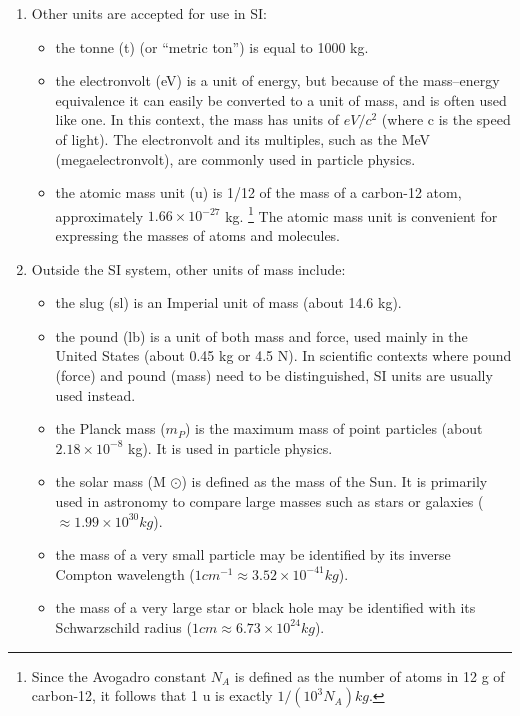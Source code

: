 \documentclass{book}
\begin{document}
    \begin{enumerate}
        \item Other units are accepted for use in SI:
        \begin{itemize}
            \item the tonne (t) (or ``metric ton'') is equal to 1000 kg.
            \item the electronvolt (eV) is a unit of energy, but because of the mass–energy equivalence it can easily be converted to a unit of mass, and is often used like one. In this context, the mass has units of $eV/c^2$ (where c is the speed of light). The electronvolt and its multiples, such as the MeV (megaelectronvolt), are commonly used in particle physics.
            \item the atomic mass unit (u) is 1/12 of the mass of a carbon-12 atom, approximately $1.66 \times 10^{-27}$ kg. \footnote{Since the Avogadro constant $N_A$ is defined as the number of atoms in 12 g of carbon-12, it follows that 1 u is exactly $1/(10^3 N_A) kg$.} The atomic mass unit is convenient for expressing the masses of atoms and molecules.
        \end{itemize}   
        
        \item Outside the SI system, other units of mass include:
        \begin{itemize}
            \item the slug (sl) is an Imperial unit of mass (about 14.6 kg).
            \item the pound (lb) is a unit of both mass and force, used mainly in the United States (about 0.45 kg or 4.5 N). In scientific contexts where pound (force) and pound (mass) need to be distinguished, SI units are usually used instead.
            \item the Planck mass ($m_P$) is the maximum mass of point particles (about $2.18 \times 10^{−8}$ kg). It is used in particle physics.
            \item the solar mass (M $\odot$) is defined as the mass of the Sun. It is primarily used in astronomy to compare large masses such as stars or galaxies ($\approx 1.99 \times 10^{30} kg$).
            \item the mass of a very small particle may be identified by its inverse Compton wavelength ($1 cm^{-1} \approx 3.52 \times 10^{-41} kg$).
            \item the mass of a very large star or black hole may be identified with its Schwarzschild radius ($1 cm \approx 6.73 \times 10^{24} kg$).
        \end{itemize}
    \end{enumerate}
    
\end{document}
